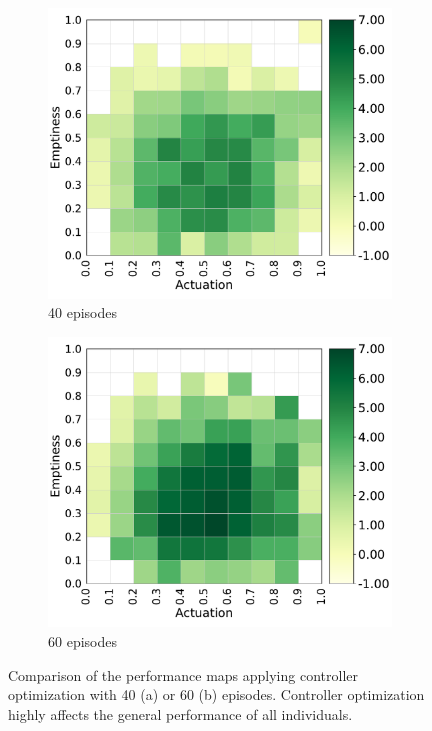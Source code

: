 \begin{figure}[h]
    \centering
    \begin{subfigure}[b]{0.49\textwidth}
         \centering
         \includegraphics[scale=0.45]{images/brain_opt/walker/walker_qd_40eps_pg}
         \caption{40 episodes}
         \label{walker_pg_40}
    \end{subfigure}
    \hfill
    \begin{subfigure}[b]{0.49\textwidth}
         \centering
         \includegraphics[scale=0.45]{images/brain_opt/walker/walker_qd_60eps_pg}
         \caption{60 episodes}
         \label{walker_pg_60}
    \end{subfigure}
    \caption{Comparison of the performance maps applying controller optimization with 40 (a) or 60 (b) episodes.
    Controller optimization highly affects the general performance of all individuals.}
    \label{fig:performance_map}
\end{figure}

